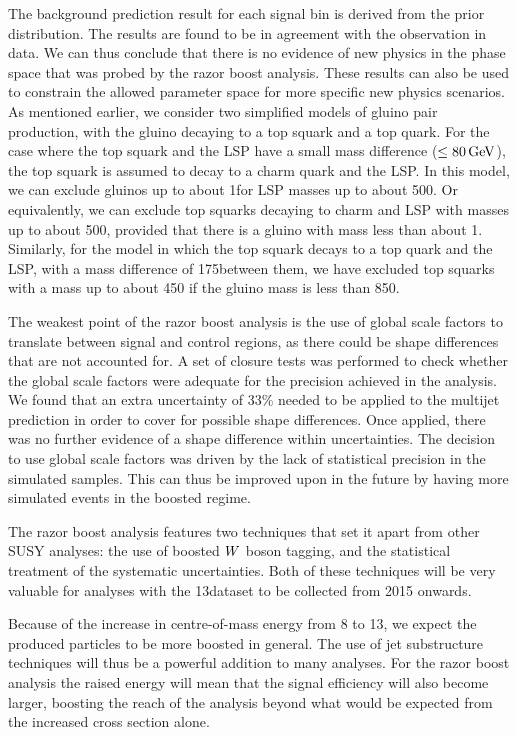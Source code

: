 The background prediction result for each signal bin is derived from the prior distribution. 
The results are found to be in agreement with the observation in data. We can thus conclude that
there is no evidence of new physics in the phase space that was probed by the razor boost analysis. 
These results can also be used to constrain the allowed parameter space for more specific new
physics scenarios. As mentioned earlier, we consider two simplified models of gluino pair
production, with the gluino decaying to a top squark and a top quark. For the case where the top
squark and the LSP have a small mass difference ($\leq 80\,\text{Ge\hspace{-.08em}V}$), the top squark is assumed to decay
to a charm quark and the LSP. In this model, we can exclude gluinos up to about 1\TeV for LSP masses
up to about 500\GeV. Or equivalently, we can exclude top squarks decaying to charm and LSP with
masses up to about 500\GeV, provided that there is a gluino with mass less than about 1\TeV. 
Similarly, for the model in which the top squark decays to a top quark and the LSP, with a mass
difference of 175\GeV between them, we have excluded top squarks with a mass up to about 450\GeV
if the gluino mass is less than 850\GeV.


The weakest point of the razor boost analysis is the use of global scale factors to translate
between signal and control regions, as there could be shape differences that are not accounted for.
A set of closure tests was performed to check whether the global scale factors were adequate for
the precision achieved in the analysis. We found that an extra uncertainty of 33\% needed to be
applied to the multijet prediction in order to cover for possible shape differences. 
Once applied, there was no further evidence of a shape difference within uncertainties. 
The decision to use global scale factors was driven by the lack of statistical precision
in the simulated samples. This can thus be improved upon in the future by having more simulated
events in the boosted regime. 


The razor boost analysis features two techniques that set it apart from other SUSY analyses: the
use of boosted $W$ boson tagging, and the statistical treatment of the systematic uncertainties. 
Both of these techniques will be very valuable for analyses with the 13\TeV dataset to be
collected from 2015 onwards. 


Because of the increase in centre-of-mass energy from 8 to 13\TeV, we expect the produced particles
to be more boosted in general. The use of jet substructure techniques will thus be a powerful
addition to many analyses. For the razor boost analysis the raised energy will mean that the
signal efficiency will also become larger, boosting the reach of the analysis beyond what would be
expected from the increased cross section alone. 

